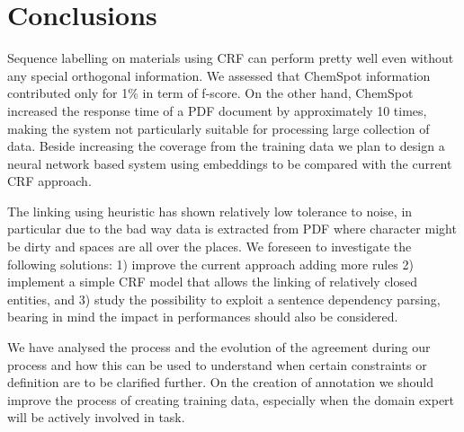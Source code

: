 \documentclass{article}
\begin{document}
\section{Conclusions}

Sequence labelling on materials using CRF can perform pretty well even without any special orthogonal information. We assessed that ChemSpot information contributed only for 1\% in term of f-score. On the other hand, ChemSpot increased the response time of a PDF document by approximately 10 times, making the system not particularly suitable for processing large collection of data. 
Beside increasing the coverage from the training data we plan to design a neural network based system using embeddings to be compared with the current CRF approach. 

The linking using heuristic has shown relatively low tolerance to noise, in particular due to the bad way data is extracted from PDF where character might be dirty and spaces are all over the places. 
We foreseen to investigate the following solutions: 1) improve the current approach adding more rules 2) implement a simple CRF model that allows the linking of relatively closed entities, and 3) study the possibility to exploit a sentence dependency parsing, bearing in mind the impact in performances should also be considered.

We have analysed the process and the evolution of the agreement during our process and how this can be used to understand when certain constraints or definition are to be clarified further. 
On the creation of annotation we should improve the process of creating training data, especially when the domain expert will be actively involved in task. 
\listoffigures



\end{document}
